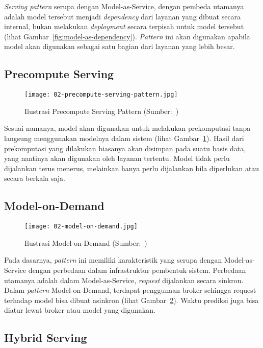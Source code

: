 \textit{Serving pattern} serupa dengan Model-as-Service, dengan pembeda utamanya adalah model tersebut menjadi \textit{dependency} dari layanan yang dibuat secara internal, bukan melakukan \textit{deployment} secara terpisah untuk model tersebut (lihat Gambar~\ref{fig:model-as-dependency}).
\textit{Pattern} ini akan digunakan apabila model akan digunakan sebagai satu bagian dari layanan yang lebih besar.

\subsection{Precompute Serving}

\begin{figure}[ht]
  \centering
  \texttt{[image: 02-precompute-serving-pattern.jpg]}
  \caption{Ilustrasi Precompute Serving Pattern (Sumber:~\cite{book-handsonml})}\label{fig:precompute-serving}
\end{figure}

Sesuai namanya, model akan digunakan untuk melakukan prekomputasi tanpa langsung menggunakan modelnya dalam sistem (lihat Gambar~\ref{fig:precompute-serving}).
Hasil dari prekomputasi yang dilakukan biasanya akan disimpan pada suatu basis data, yang nantinya akan digunakan oleh layanan tertentu.
Model tidak perlu dijalankan terus menerus, melainkan hanya perlu dijalankan bila diperlukan atau secara berkala saja.

\subsection{Model-on-Demand}

\begin{figure}[ht]
  \centering
  \texttt{[image: 02-model-on-demand.jpg]}
  \caption{Ilustrasi Model-on-Demand (Sumber:~\cite{book-handsonml})}\label{fig:model-on-demand}
\end{figure}

Pada dasarnya, \textit{pattern} ini memiliki karakteristik yang serupa dengan Model-as-Service dengan perbedaan dalam infrastruktur pembentuk sistem.
Perbedaan utamanya adalah dalam Model-as-Service, \textit{request} dijalankan secara sinkron.
Dalam \textit{pattern} Model-on-Demand, terdapat penggunaan broker sehingga request terhadap model bisa dibuat asinkron (lihat Gambar~\ref{fig:model-on-demand}).
Waktu prediksi juga bisa diatur lewat broker atau model yang digunakan.

\subsection{Hybrid Serving}

